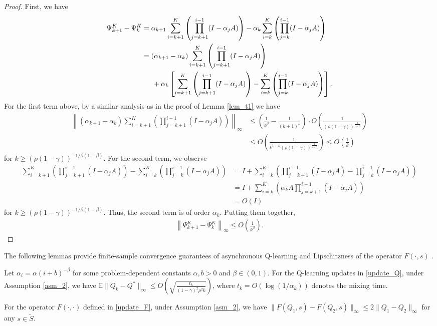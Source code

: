 \documentclass{opt2025} %
\begin{document}
\begin{proof}
First, we have
\begin{align*}
\Psi_{k+1}^K - \Psi_{k}^K &=\alpha_{k+1} \sum_{i=k+1}^{K} \left( \prod_{j=k+1}^{i-1} (I - \alpha_j A) \right) - \alpha_{k} \sum_{i=k}^{K} \left( \prod_{j=k}^{i-1} (I - \alpha_j A) \right)\\
&= (\alpha_{k+1}-\alpha_k) \sum_{i=k+1}^{K} \left( \prod_{j=k+1}^{i-1} (I - \alpha_j A) \right) \\
&\indent + \alpha_{k} \left[\sum_{i=k+1}^{K} \left( \prod_{j=k+1}^{i-1} (I - \alpha_j A) \right) -\sum_{i=k}^{K} \left( \prod_{j=k}^{i-1} (I - \alpha_j A) \right) \right].
\end{align*}
For the first term above, by a similar analysis as in the proof of Lemma \ref{lem_t1} we have
\begin{align*}
\left\| (\alpha_{k+1}-\alpha_k) \sum_{i=k+1}^{K} \left( \prod_{j=k+1}^{i-1} (I - \alpha_j A) \right)\right\|_{\infty} &\leq \left( \frac{1}{k^{\beta}}-\frac{1}{(k+1)^{\beta}} \right) \cdot  O\left( \frac{1}{(\rho(1-\gamma))^{\frac{1}{1-\beta}}}  \right) \\
&\leq O\left( \frac{1}{k^{1+\beta}(\rho(1-\gamma))^{\frac{1}{1-\beta}}}  \right) \leq O\left(\frac{1}{k}\right)
\end{align*}
for $k \geq (\rho(1-\gamma))^{-1/\beta(1-\beta)}$. For the second term, we observe
\begin{align*}
\sum_{i=k+1}^{K} \left( \prod_{j=k+1}^{i-1} (I - \alpha_j A) \right) -\sum_{i=k}^{K} \left( \prod_{j=k}^{i-1} (I - \alpha_j A) \right) &= I + \sum_{i=k}^{K} \left( \prod_{j=k+1}^{i-1} (I - \alpha_j A) - \prod_{j=k}^{i-1} (I - \alpha_j A) \right)\\
&= I + \sum_{i=k}^{K} \left( \alpha_k A \prod_{j=k+1}^{i-1} (I - \alpha_j A) \right)\\
&= O(I)
\end{align*}
for $k \geq (\rho(1-\gamma))^{-1/\beta(1-\beta)}$. Thus, the second term is of order $\alpha_k$. Putting them together,
\begin{align*}
\left\| \Psi_{k+1}^K - \Psi_{k}^K \right\|_{\infty} \leq O\left( \frac{1}{k^{\beta}}\right).
\end{align*}
\end{proof}


The following lemmas provide finite-sample convergence guarantees of asynchronous Q-learning and Lipschitzness of the operator $F(\cdot,s)$ \citep{chen2021lyapunov}.

\begin{lemma}
\label{lem_t4}
Let $\alpha_i = \alpha{(i + b)^{-\beta}}$ for some problem-dependent constants $\alpha, b > 0$ and $\beta \in (0,1)$. For the Q-learning updates in \cref{update_Q}, under Assumption \ref{asm_2}, we have $\mathbb{E}\| Q_k - Q^{*} \|_{\infty} \leq O\left( \sqrt{\frac{t_k}{(1-\gamma)^2\rho^2 k}} \right)$, where $t_k=O(\log(1/\alpha_k))$ denotes the mixing time.
\end{lemma}

\begin{lemma}
\label{lem_lipF}
For the operator $F(\cdot,\cdot)$ defined in \cref{update_F},  under Assumption \ref{asm_2}, we have $\|F(Q_1,s)-F(Q_2,s)\|_{\infty} \leq 2 \| Q_1 - Q_2\|_{\infty} $ for any $s \in \tilde{S}$.
\end{lemma}
\end{document}
